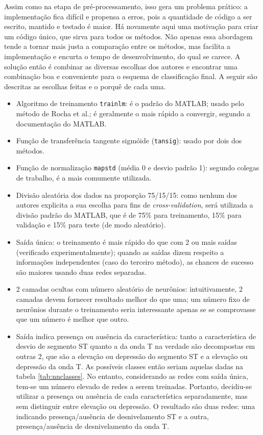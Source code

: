 Assim como na etapa de pré-processamento, isso gera um problema prático: a implementação fica difícil e propensa a erros, pois a quantidade de código a ser escrito, mantido e testado é maior. Há novamente aqui uma motivação para criar um código único, que sirva para todos os métodos. Não apenas essa abordagem tende a tornar mais justa a comparação entre os métodos, mas facilita a implementação e encurta o tempo de desenvolvimento, do qual se carece. A solução então é combinar as diversas escolhas dos autores e encontrar uma combinação boa e conveniente para o esquema de classificação final. A seguir são descritas as escolhas feitas e o porquê de cada uma.

\begin{itemize}
    \item Algoritmo de treinamento \texttt{trainlm}: é o padrão do MATLAB; usado pelo método de Rocha et al.; é geralmente o mais rápido a convergir, segundo a documentação do MATLAB.
    \item Função de transferência tangente sigmóide (\texttt{tansig}): usado por dois dos métodos.
    \item Função de normalização \texttt{mapstd} (média 0 e desvio padrão 1): segundo colegas de trabalho, é a mais comumente utilizada.
    \item Divisão aleatória dos dados na proporção 75/15/15: como nenhum dos autores explicita a sua escolha para fins de \emph{cross-validation}, será utilizada a divisão padrão do MATLAB, que é de 75\% para treinamento, 15\% para validação e 15\% para teste (de modo aleatório).
    \item Saída única: o treinamento é mais rápido do que com 2 ou mais saídas (verificado experimentalmente); quando as saídas dizem respeito a informações independentes (caso do terceiro método), as chances de sucesso são maiores usando duas redes separadas.
    \item 2 camadas ocultas com número aleatório de neurônios: intuitivamente, 2 camadas devem fornecer resultado melhor do que uma; um número fixo de neurônios durante o treinamento seria interessante apenas se se comprovasse que um número é melhor que outro.
    \item Saída indica presença ou ausência da característica: tanto a característica de desvio de segmento ST quanto a da onda T na verdade são decompostas em outras 2, que são a elevação ou depressão do segmento ST e a elevação ou depressão da onda T. As possíveis classes então seriam aquelas dadas na tabela \ref{tab:nnclasses}. No entanto, considerando as redes com saída única, tem-se um número elevado de redes a serem treinadas. Portanto, decidiu-se utilizar a presença ou ausência de cada característica separadamente, mas sem distinguir entre elevação ou depressão. O resultado são duas redes: uma indicando presença/ausência de desnivelamento ST e a outra, presença/ausência de desnivelamento da onda T.

\end{itemize}
